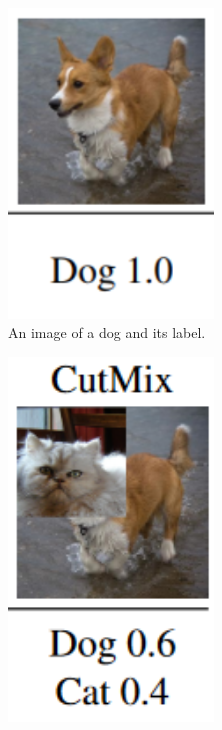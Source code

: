 \documentclass[60pt]{article}
\begin{document}
\begin{figure}[!h]
    \centering
    \begin{subfigure}[t]{0.3\textwidth}
        \centering
        \includegraphics[width=0.6\textwidth]{dog.png}
        \caption{An image of a dog and its label.}
        \label{fig:dog}
    \end{subfigure}
    \hfill
    \begin{subfigure}[t]{0.3\textwidth}
        \centering
        \includegraphics[width=0.6\textwidth]{cutmix.png}

\end{subfigure}
\end{figure}
\end{document}
